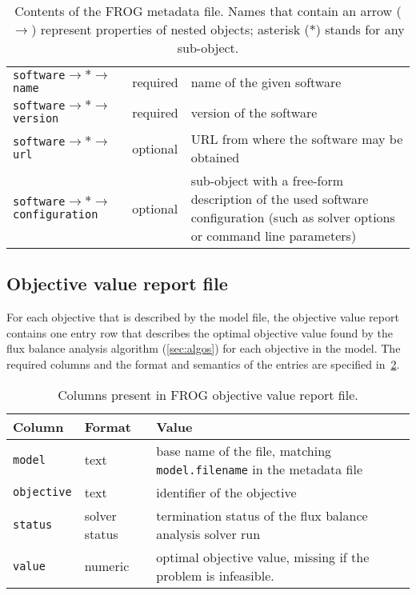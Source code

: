 \begin{table}
\begin{tabular}{llp{30em}}
\verb|software|$\to\ast\to$\verb|name|
 & required
 & name of the given software
 \\
\verb|software|$\to\ast\to$\verb|version|
 & required
 & version of the software
 \\
\verb|software|$\to\ast\to$\verb|url|
 & optional
 & URL from where the software may be obtained
 \\
\verb|software|$\to\ast\to$\verb|configuration|
 & optional
 & sub-object with a free-form description of the used software configuration (such as solver options or command line parameters)
 \\
\bottomrule
\end{tabular}
\caption[Contents of the FROG metadata file.]{Contents of the FROG metadata file. Names that contain an arrow ($\to$) represent properties of nested objects; asterisk ($\ast$) stands for any sub-object.}
\label{tab:metadata}
\end{table}

\subsection{Objective value report file}
\label{sec:obj}

For each objective that is described by the model file, the objective value report contains one entry row that describes the optimal objective value found by the flux balance analysis algorithm (\cref{sec:algos}) for each objective in the model. The required columns and the format and semantics of the entries are specified in~\cref{tab:objfields}.

\begin{table}\tablefont
\begin{tabular}{llp{30em}}
\toprule
Column & Format & Value \\
\midrule
\verb|model|
 & text
 & base name of the file, matching \verb|model.filename| in the metadata file
 \\
\verb|objective|
 & text
 & identifier of the objective
 \\
\verb|status|
 & solver status
 & termination status of the flux balance analysis solver run
 \\
\verb|value|
 & numeric
 & optimal objective value, missing if the problem is infeasible.
 \\
\bottomrule
\end{tabular}
\caption{Columns present in FROG objective value report file.}
\label{tab:objfields}
\end{table}

